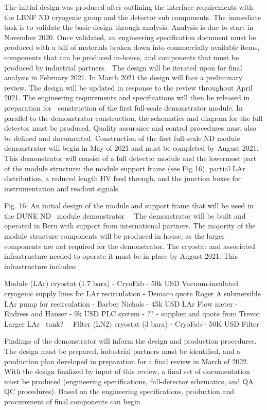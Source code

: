 The initial design was produced after outlining the interface requirements with the LBNF ND cryogenic group and the detector sub components. The immediate task is to validate the basic design through analysis. Analysis is due to start in November 2020. Once validated, an engineering specification document must be produced with a bill of materials broken down into commercially available items, components that can be produced in-house, and components that must be produced by industrial partners.  The design will be iterated upon for final analysis in February 2021. In March 2021 the design will face a preliminary review. The design will be updated in response to the review throughout April 2021. The engineering requirements and specifications will then be released in preparation for  construction of the first full-scale demonstrator module. In parallel to the demonstrator construction, the schematics and diagram for the full detector must be produced. Quality assurance and control procedures must also be defined and documented. 
Construction of the first full-scale ND module demonstrator will begin in May of 2021 and must be completed by August 2021. This demonstrator will consist of a full detector module and the lowermost part of the module structure: the module support frame (see Fig 16), partial LAr distribution, a reduced length HV feed through, and the junction boxes for instrumentation and readout signals.

Fig. 16: An initial design of the module and support frame that will be used in the DUNE ND  module demonstrator 
 The demonstrator will be built and operated in Bern with support from international partners. The majority of the module structure components will be produced in house, as the larger components are not required for the demonstrator. The cryostat and associated infrastructure needed to operate it must be in place by August 2021. This infrastructure includes:

Module (LAr) cryostat (1.7 bara) - CryoFab - 50k USD
Vacuum-insulated cryogenic supply lines for LAr recirculation - Demaco quote Roger
A submersible LAr pump for recirculation - Barber Nichols - 45k USD
LAr Flow meter - Endress and Hauser - 9k USD
PLC system - ?? - supplier and quote from Trevor
Larger LAr  tank?  
Filter (LN2) cryostat (3 bara) - CryoFab - 50K USD
Filter

Findings of the demonstrator will inform the design and production procedures. The design must be prepared, industrial partners must be identified, and a production plan developed in preparation for a final review in March of 2022. With the design finalized by input of this review, a final set of documentation must be produced (engineering specifications, full-detector schematics, and QA QC procedures). Based on the engineering specifications, production and procurement of final components can begin.

